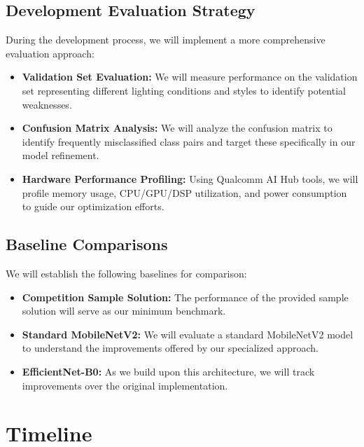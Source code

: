 \documentclass[11pt, oneside]{article}   	%
\begin{document}
\subsection*{Development Evaluation Strategy}

During the development process, we will implement a more comprehensive evaluation approach:

\begin{itemize}

	\item \textbf{Validation Set Evaluation:} We will measure performance on the validation set representing different lighting conditions and styles to identify potential weaknesses.

	\item \textbf{Confusion Matrix Analysis:} We will analyze the confusion matrix to identify frequently misclassified class pairs and target these specifically in our model refinement.

	\item \textbf{Hardware Performance Profiling:} Using Qualcomm AI Hub tools, we will profile memory usage, CPU/GPU/DSP utilization, and power consumption to guide our optimization efforts.
\end{itemize}

\subsection*{Baseline Comparisons}

We will establish the following baselines for comparison:

\begin{itemize}
	\item \textbf{Competition Sample Solution:} The performance of the provided sample solution will serve as our minimum benchmark.

	\item \textbf{Standard MobileNetV2:} We will evaluate a standard MobileNetV2 model to understand the improvements offered by our specialized approach.

	\item \textbf{EfficientNet-B0:} As we build upon this architecture, we will track improvements over the original implementation.

\end{itemize}


\section*{Timeline}
\end{document}
